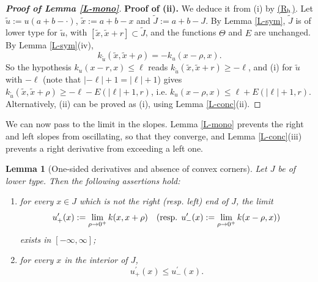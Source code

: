 \documentclass[reqno,12pt]{amsart}
\numberwithin{equation}{section}
\newcommand{\Rh}{\hyperref[HypS2]{{\sf (R$_{\rm h}$)}}}
\newtheorem{lemma}[theorem]{Lemma}
\theoremstyle{remark}
\begin{document}
\begin{proof}[\bf Proof of Lemma \ref{L-mono}]
{\bf Proof of (ii).} We deduce it from (i) by \Rh{}. Let $\widetilde u:=u(a+b-\cdot)$, $\widetilde x:=a+b-x$ and $\widetilde J:=a+b-J$. By Lemma \ref{L-sym}, $\widetilde J$ is of lower type for $\widetilde u$, with $[\widetilde x,\widetilde x+r]\subset\widetilde J$, and the functions $\Theta$ and $E$ are unchanged. By Lemma \ref{L-sym}(iv),
\begin{equation*}
k_{\widetilde u}(\widetilde x,\widetilde x+\rho)=-k_u(x-\rho,x).
\end{equation*}
So the hypothesis $k_u(x-r,x)\leq\ell$ reads $k_{\widetilde u}(\widetilde x,\widetilde x+r)\geq-\ell$, and (i) for $\widetilde u$ with $-\ell$ (note that $|-\ell|+1=|\ell|+1$) gives $k_{\widetilde u}(\widetilde x,\widetilde x+\rho)\geq-\ell-E(|\ell|+1,r)$, i.e. $k_u(x-\rho,x)\leq\ell+E(|\ell|+1,r)$. Alternatively, (ii) can be proved as (i), using Lemma \ref{L-conc}(ii).
\end{proof}

We can now pass to the limit in the slopes. Lemma \ref{L-mono} prevents the right and left slopes from oscillating, so that they converge, and Lemma \ref{L-conc}(iii) prevents a right derivative from exceeding a left one.

\begin{lemma}[One-sided derivatives and absence of convex corners]\label{L-corner}
Let $J$ be of lower type. Then the following assertions hold{\rm:}
\begin{enumerate}[leftmargin=3em, itemsep=0.6em, topsep=0.6em]
\item[{\rm(i)}] for every $x\in J$ which is not the right {\rm(}resp. left{\rm)} end of $J$, the limit
\begin{equation*}
u^\prime_+(x):=\lim_{\rho\to0^+}k(x,x+\rho)\quad{\rm(}\hbox{resp. }u^\prime_-(x):=\lim_{\rho\to0^+}k(x-\rho,x){\rm)}
\end{equation*}
exists in $[-\infty,\infty]${\rm;}
\item[{\rm(ii)}] for every $x$ in the interior of $J$,
\begin{equation*}
u^\prime_+(x)\leq u^\prime_-(x).
\end{equation*}
\end{enumerate}
\end{lemma}
\end{document}
